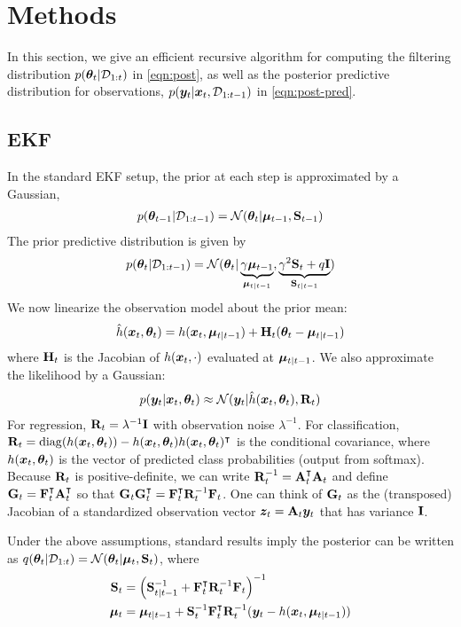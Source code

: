 \section{Methods}
\label{sec:methods}

In this section, we give an efficient recursive algorithm
for computing the filtering distribution
$p({\bm{\theta}}_t|{\mathcal{D}}_{1:t})$ in \cref{eqn:post},
as well as the posterior predictive distribution
for observations,
$p({\bm{y}}_t|{\bm{x}}_t,{\mathcal{D}}_{1:t-1})$ in \cref{eqn:post-pred}.


\subsection{EKF}

In the standard EKF setup, the prior at each step is approximated by a Gaussian,
\begin{align}
    p({\bm{\theta}}_{t-1}|{\mathcal{D}}_{1:t-1}) = \mathcal{N}({\bm{\theta}}_t  | 
    \boldsymbol{\mu}_{t-1}, \mathbf{S}_{t-1})
\end{align}
The prior predictive distribution is given by
\begin{align}
p({\bm{\theta}}_t |{\mathcal{D}}_{1:t-1})=
\mathcal{N}({\bm{\theta}}_t| \underbrace{\gamma \boldsymbol{\mu}_{t-1}}_{\boldsymbol{\mu}_{t|t-1}},
\underbrace{\gamma^2 \mathbf{S}_t + q\mathbf{I}}_{\mathbf{S}_{t|t-1}})
\end{align}
We now linearize the observation model
about the prior mean:
\begin{align}
    \hat{h}({\bm{x}}_t,{\bm{\theta}}_t) =
    h({\bm{x}}_t,\boldsymbol{\mu}_{t|t-1}) + \mathbf{H}_t({\bm{\theta}}_t-\boldsymbol{\mu}_{t|t-1})
\end{align}
where $\mathbf{H}_t$ is the Jacobian of $h({\bm{x}}_t,\cdot)$ evaluated at $\boldsymbol{\mu}_{t|t-1}$.
We also approximate the likelihood by a Gaussian:
\begin{align}
    p({\bm{y}}_t|{\bm{x}}_t,{\bm{\theta}}_t) \approx \mathcal{N}({\bm{y}}_t | \hat{h}({\bm{x}}_t,{\bm{\theta}}_t),\mathbf{R}_t)
\end{align}
For regression, $\mathbf{R}_t=\lambda^{-1}\mathbf{I}$ with observation noise $\lambda^{-1}$. For classification, 
$\mathbf{R}_t = \mathrm{diag}(h({\bm{x}}_t,{\bm{\theta}}_t)) - h({\bm{x}}_t,{\bm{\theta}}_t) h({\bm{x}}_t,{\bm{\theta}}_t)^\intercal$ is the conditional covariance, where
$h({\bm{x}}_t,{\bm{\theta}}_t)$ is the vector of predicted class probabilities (output from softmax).
Because $\mathbf{R}_t$ is positive-definite, we can write $\mathbf{R}_t^{-1} = \mathbf{A}_t^\intercal\mathbf{A}_t$
and define $\mathbf{G}_t = \mathbf{F}_t^\intercal\mathbf{A}_t^\intercal$ so that $\mathbf{G}_t\mathbf{G}_t^\intercal = \mathbf{F}_t^\intercal \mathbf{R}_t^{-1} \mathbf{F}_t$.
One can think of $\mathbf{G}_t$ as the (transposed) Jacobian of a standardized observation vector ${\bm{z}}_t=\mathbf{A}_t{\bm{y}}_t$
that has variance $\mathbf{I}$.

Under the above assumptions, standard  results imply the posterior can be written as
$q({\bm{\theta}}_{t}|{\mathcal{D}}_{1:t}) = \mathcal{N}({\bm{\theta}}_t  |     \boldsymbol{\mu}_{t}, \mathbf{S}_{t})$,
where
\begin{align}
      \mathbf{S}_t &= \left( \mathbf{S}_{t|t-1}^{-1} + \mathbf{F}_t^\intercal \mathbf{R}_t^{-1} \mathbf{F}_t \right)^{-1} 
    \label{eq:EKF-var-update} \\
    \boldsymbol{\mu}_t &= \boldsymbol{\mu}_{t|t-1} + \mathbf{S}_t^{-1} \mathbf{F}_t^\intercal \mathbf{R}_t^{-1} ({\bm{y}}_t - h({\bm{x}}_t,\boldsymbol{\mu}_{t|t-1}))
    \label{eq:EKF-mu-update}
\end{align}

